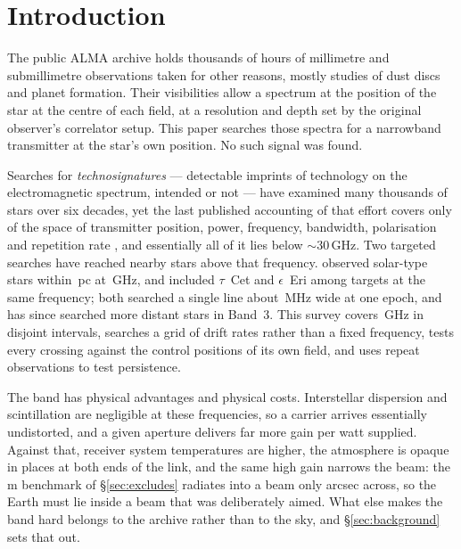 \section{Introduction}
\label{sec:intro}

The public ALMA archive holds thousands of hours of millimetre and
submillimetre observations taken for other reasons, mostly studies of dust
discs and planet formation. Their visibilities allow a spectrum at the
position of the star at the centre of each field, at a resolution and depth
set by the original observer's correlator setup. This paper searches those
spectra for a narrowband transmitter at the star's own position. No such
signal was found.

Searches for \emph{technosignatures} --- detectable imprints of technology on
the electromagnetic spectrum, intended or not
\citep{Sheikh2020,SETIreview2025} --- have examined many thousands of stars
over six decades, yet the last published accounting of that effort covers
only \HaystackFrac{} of the space of transmitter position, power, frequency,
bandwidth, polarisation and repetition rate
\citep{Wright2018}, and essentially all of it lies below
${\sim}30$\,GHz. Two targeted searches have reached nearby stars above that frequency.
\citet{Steffes1994} observed \SbPriorNStarA{} solar-type stars within
\SbPriorDistA\,pc at \SbPriorFreqGHz\,GHz, and \citet{Mauersberger1996}
included $\tau$~Cet and $\epsilon$~Eri among \SbPriorNStarB{} targets at the
same frequency; both searched a single line about \SbPriorBandMHz\,MHz wide at
one epoch, and \citet{Mason2025} has since searched more distant stars in
Band~3. This survey covers
\DnuA\,GHz in \CovNIslands{} disjoint intervals, searches a grid of drift rates rather
than a fixed frequency, tests every crossing against the \BdNCtrl{} control positions of
its own field, and uses repeat observations to test persistence.

The band has physical advantages and physical costs. Interstellar dispersion
and scintillation are negligible at these frequencies, so a carrier arrives
essentially undistorted, and a given aperture delivers far more gain per watt
supplied. Against that, receiver system temperatures are higher, the
atmosphere is opaque in places at both ends of the link, and the same high
gain narrows the beam: the \BenchDiam\,m benchmark of
\S\ref{sec:excludes} radiates into a beam only \BmArcsec{} arcsec across, so
the Earth must lie inside a beam that was deliberately aimed. What else makes
the band hard belongs to the archive rather than to the sky, and
\S\ref{sec:background} sets that out.

